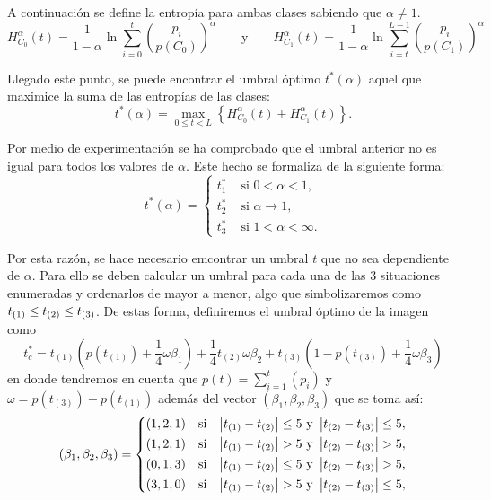 
A continuación se define la entropía para ambas clases sabiendo que $\alpha\neq 1$.
$$H_{C_0}^{\alpha}(t) = \frac{1}{1-\alpha}\ln \sum_{i=0}^{t}\left(\frac{p_i}{p(C_0)}\right)^\alpha \qquad\text{y}\qquad 
H_{C_1}^{\alpha}(t) = \frac{1}{1-\alpha}\ln \sum_{i=t}^{L-1}\left(\frac{p_i}{p(C_1)}\right)^\alpha$$

Llegado este punto, se puede encontrar el umbral óptimo $t^*(\alpha)$ aquel que maximice la suma de las entropías de las clases:
$$t^*(\alpha)=\max_{0\leq t<L}\left\{H_{C_0}^{\alpha}(t)+H_{C_1}^{\alpha}(t)\right\}.$$

Por medio de experimentación se ha comprobado que el umbral anterior no es igual para todos los valores de $\alpha$. Este hecho se formaliza de la siguiente forma:
$$t^*(\alpha)=\left\{\begin{aligned}
    t^*_1 & \text{  si  }0<\alpha<1,\\
    t^*_2 & \text{  si  }\alpha\rightarrow1,\\
    t^*_3 & \text{  si  }1<\alpha<\infty.
\end{aligned}\right.$$

Por esta razón, se hace necesario emcontrar un umbral $t$ que no sea dependiente de $\alpha$. Para ello se deben calcular un umbral para cada una de las 3 situaciones enumeradas y ordenarlos de mayor a menor, algo que simbolizaremos como $t_{(1)}\leq t_{(2)}\leq t_{(3)}$. De estas forma, definiremos el umbral óptimo de la imagen como 
$$t^*_c = t_{(1)} \left(p(t_{(1)})+\frac{1}{4}\omega\beta_1\right)
        + \frac{1}{4}t_{(2)}\omega\beta_2
        + t_{(3)} \left(1-p(t_{(3)})+\frac{1}{4}\omega\beta_3\right)$$
en donde tendremos en cuenta que $p(t)=\sum_{i=1}^t(p_i)$ y $\omega=p(t_{(3)})-p(t_{(1)})$ además del vector $(\beta_1, \beta_2, \beta_3)$ que se toma así:
$$(\beta_1, \beta_2, \beta_3) =  \left\{\begin{aligned}
    (1, 2, 1) & \quad\text{si} &\left\vert t_{(1)}-t_{(2)}\right\vert\leq 5 \text{ y } \left\vert t_{(2)}-t_{(3)}\right\vert\leq 5,\\
    (1, 2, 1) & \quad\text{si} &\left\vert t_{(1)}-t_{(2)}\right\vert  >  5 \text{ y } \left\vert t_{(2)}-t_{(3)}\right\vert  >  5,\\
    (0, 1, 3) & \quad\text{si} &\left\vert t_{(1)}-t_{(2)}\right\vert\leq 5 \text{ y } \left\vert t_{(2)}-t_{(3)}\right\vert  >  5,\\
    (3, 1, 0) & \quad\text{si} &\left\vert t_{(1)}-t_{(2)}\right\vert  >  5 \text{ y } \left\vert t_{(2)}-t_{(3)}\right\vert\leq 5,   
\end{aligned}\right.$$


